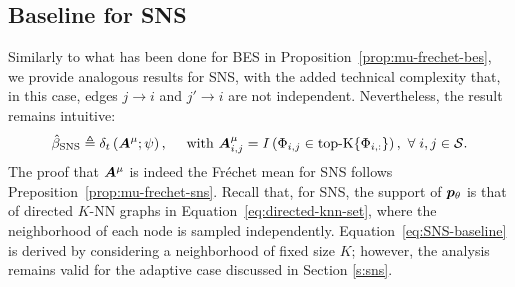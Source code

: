 \subsection{Baseline for SNS}\label{sec:frechet-mean-sns}

Similarly to what has been done for BES in Proposition~\ref{prop:mu-frechet-bes}, we provide analogous results for SNS, with the added technical complexity that, in this case, edges $j\to i$ and $j'\to i$ are not independent. Nevertheless, the result remains intuitive:
\begin{equation}\label{eq:SNS-baseline}
    \hat \beta_\text{SNS} \triangleq \delta_t\left({\bm{A}}^\mu;\psi\right), \quad\text{ with } {\bm{A}}^\mu_{i,j} = I\left(\Phi_{i,j} \in \small{\operatorname*{top-K}} \{\Phi_{i,:}\}\right),\ \forall\;i,j\in\mathcal{S}.
\end{equation}
The proof that ${\bm{A}}^\mu$ is indeed the Fr\'echet mean for SNS follows Preposition~\ref{prop:mu-frechet-sns}.
Recall that, for SNS, the support of ${{\bm{p}}_\theta}$ is that of directed $K$-NN graphs in Equation~\eqref{eq:directed-knn-set}, where the neighborhood of each node is sampled independently. Equation~\eqref{eq:SNS-baseline} is derived by considering a neighborhood of fixed size $K$; however, the analysis remains valid for the adaptive case discussed in Section \ref{s:sns}.


